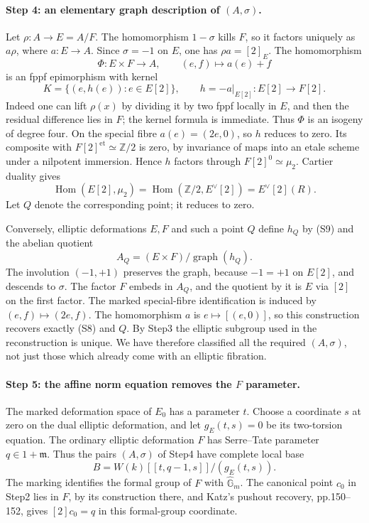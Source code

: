 \paragraph{Step 4: an elementary graph description of $(A,\sigma)$.}
Let $\rho:A\to E=A/F$. The homomorphism $1-\sigma$ kills $F$, so
it factors uniquely as $a\rho$, where $a:E\to A$. Since
$\sigma=-1$ on $E$, one has $\rho a=[2]_E$.
The homomorphism
\[
 \Phi:E\times F\longrightarrow A,\qquad(e,f)\longmapsto a(e)+f
\]
is an fppf epimorphism with kernel
\[
 K=\{(e,h(e)):e\in E[2]\},\qquad
 h=-a|_{E[2]}:E[2]\longrightarrow F[2].                 \tag{S8}
\]
Indeed one can lift $\rho(x)$ by dividing it by two fppf locally in
$E$, and then the residual difference lies in $F$; the kernel formula
is immediate. Thus $\Phi$ is an isogeny of degree four.
On the special fibre $a(e)=(2e,0)$, so $h$ reduces to zero.
Its composite with $F[2]^{\mathrm{et}}\simeq\mathbb Z/2$ is
zero, by invariance of maps into an etale scheme under a nilpotent
immersion. Hence $h$ factors through $F[2]^0\simeq\mu_2$.
Cartier duality gives
\[
 \operatorname{Hom}(E[2],\mu_2)
  =\operatorname{Hom}(\mathbb Z/2,E^\vee[2])
  =E^\vee[2](R).                                       \tag{S9}
\]
Let $Q$ denote the corresponding point; it reduces to zero.

Conversely, elliptic deformations $E,F$ and such a point $Q$ define
$h_Q$ by (S9) and the abelian quotient
\[
 A_Q=(E\times F)/\operatorname{graph}(h_Q).               \tag{S10}
\]
The involution $(-1,+1)$ preserves the graph, because $-1=+1$ on
$E[2]$, and descends to $\sigma$. The factor $F$ embeds in $A_Q$,
and the quotient by it is $E$ via $[2]$ on the first factor.
The marked special-fibre identification is induced by
$(e,f)\mapsto(2e,f)$. The homomorphism $a$ is $e\mapsto[(e,0)]$,
so this construction recovers exactly (S8) and $Q$. By Step3 the
elliptic subgroup used in the reconstruction is unique. We have
therefore classified all the required $(A,\sigma)$, not just those
which already come with an elliptic fibration.

\paragraph{Step 5: the affine norm equation removes the $F$ parameter.}
The marked deformation space of $E_0$ has a parameter $t$.
Choose a coordinate $s$ at zero on the dual elliptic deformation,
and let $g_E(t,s)=0$ be its two-torsion equation. The ordinary
elliptic deformation $F$ has Serre--Tate parameter $q\in1+\mathfrak m$.
Thus the pairs $(A,\sigma)$ of Step4 have complete local base
\[
 B=W(k)[[t,q-1,s]]/(g_E(t,s)).                           \tag{S11}
\]
The marking identifies the formal group of $F$ with
$\widehat{\mathbb G}_m$. The canonical point $c_0$ in Step2 lies
in $F$, by its construction there, and Katz's pushout recovery,
pp.150--152, gives $[2]c_0=q$ in this formal-group coordinate.

